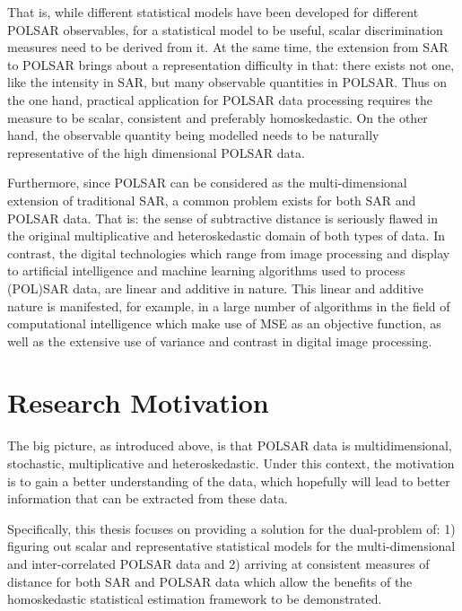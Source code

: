 That is, while different statistical models have been developed for different POLSAR
observables, for a statistical model to be useful, scalar discrimination measures need to
be derived from it. At the same time, the extension from SAR to POLSAR brings about
a representation difficulty in that: there exists not one, like the intensity in SAR, but
many observable quantities in POLSAR. Thus on the one hand, practical application for
POLSAR data processing requires the measure to be scalar, consistent and preferably
homoskedastic. On the other hand, the observable quantity being modelled needs to
be naturally representative of the high dimensional POLSAR data.

Furthermore, since POLSAR can be considered as the multi-dimensional extension of
traditional SAR, a common problem exists for both SAR and POLSAR data. That
is: the sense of subtractive distance is seriously flawed in the original multiplicative
and heteroskedastic domain of both types of data. 
In contrast, the digital technologies which range from image processing and display to artificial intelligence and machine learning algorithms used to process (POL)SAR data, are linear
and additive in nature. 
This linear and additive nature is manifested, for example, in a
large number of algorithms in the field of computational intelligence which make use of
MSE as an objective function, as well as the extensive use of variance and
contrast in digital image processing. %

\section{Research Motivation}

The
                big picture, as introduced above, is that POLSAR data is multi­dimensional,
                stochastic, multiplicative and heteroskedastic.
Under
                this context, the motivation is to gain a better
                understanding of the data,
which
                hopefully will lead to better information that can be
                extracted from these data.

Specifically, 
  this thesis focuses on providing a solution for the
                dual-problem of: 1) figuring out scalar and
                representative statistical models for the
                multi-dimensional and inter-correlated POLSAR data and
                2) arriving at consistent measures of distance for both
                SAR and POLSAR data which allow the benefits of the
                homoskedastic statistical estimation framework to be
                demonstrated.

